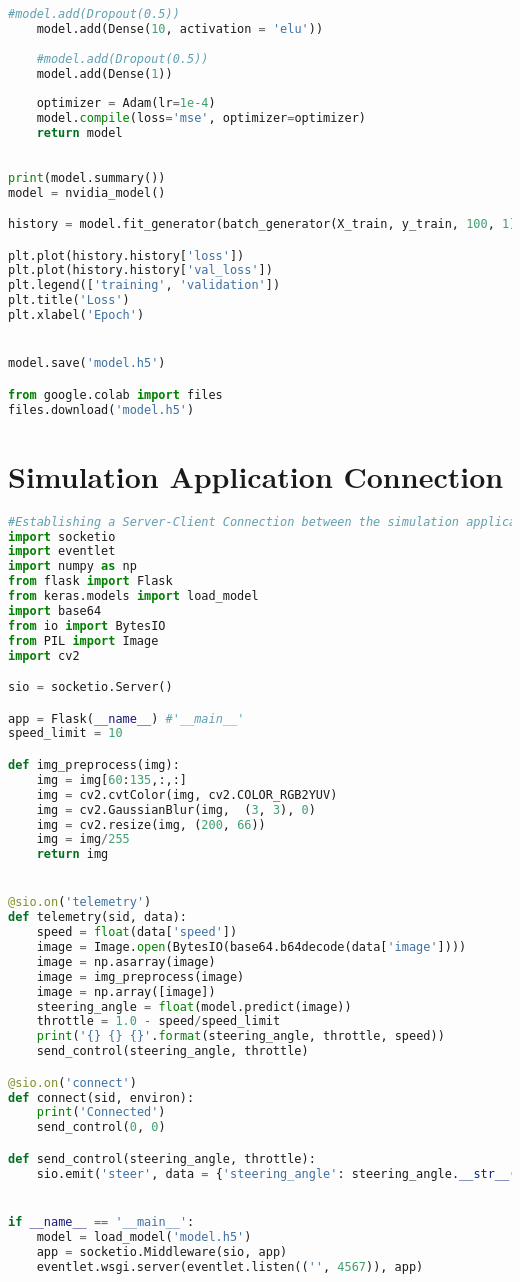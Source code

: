 \begin{lstlisting}[language=Python]
	#model.add(Dropout(0.5))
	model.add(Dense(10, activation = 'elu'))
	
	#model.add(Dropout(0.5))
	model.add(Dense(1))
	
	optimizer = Adam(lr=1e-4)
	model.compile(loss='mse', optimizer=optimizer)
	return model
	
	
print(model.summary())
model = nvidia_model()

history = model.fit_generator(batch_generator(X_train, y_train, 100, 1), steps_per_epoch=300, epochs=10, validation_data=batch_generator(X_valid, y_valid, 100, 0), validation_steps=200, verbose=1, shuffle = 1)

plt.plot(history.history['loss'])
plt.plot(history.history['val_loss'])
plt.legend(['training', 'validation'])
plt.title('Loss')
plt.xlabel('Epoch')


model.save('model.h5')

from google.colab import files
files.download('model.h5')
\end{lstlisting}

\section{Simulation Application Connection}

\begin{lstlisting}[language=Python]
#Establishing a Server-Client Connection between the simulation application and our trained Deep-Learning Model(model.h5)
import socketio
import eventlet
import numpy as np
from flask import Flask
from keras.models import load_model
import base64
from io import BytesIO
from PIL import Image
import cv2

sio = socketio.Server()

app = Flask(__name__) #'__main__'
speed_limit = 10

def img_preprocess(img):
	img = img[60:135,:,:]
	img = cv2.cvtColor(img, cv2.COLOR_RGB2YUV)
	img = cv2.GaussianBlur(img,  (3, 3), 0)
	img = cv2.resize(img, (200, 66))
	img = img/255
	return img


@sio.on('telemetry')
def telemetry(sid, data):
	speed = float(data['speed'])
	image = Image.open(BytesIO(base64.b64decode(data['image'])))
	image = np.asarray(image)
	image = img_preprocess(image)
	image = np.array([image])
	steering_angle = float(model.predict(image))
	throttle = 1.0 - speed/speed_limit
	print('{} {} {}'.format(steering_angle, throttle, speed))
	send_control(steering_angle, throttle)

@sio.on('connect')
def connect(sid, environ):
	print('Connected')
	send_control(0, 0)

def send_control(steering_angle, throttle):
	sio.emit('steer', data = {'steering_angle': steering_angle.__str__(),'throttle': throttle.__str__()})


if __name__ == '__main__':
	model = load_model('model.h5')
	app = socketio.Middleware(sio, app)
	eventlet.wsgi.server(eventlet.listen(('', 4567)), app)

\end{lstlisting}